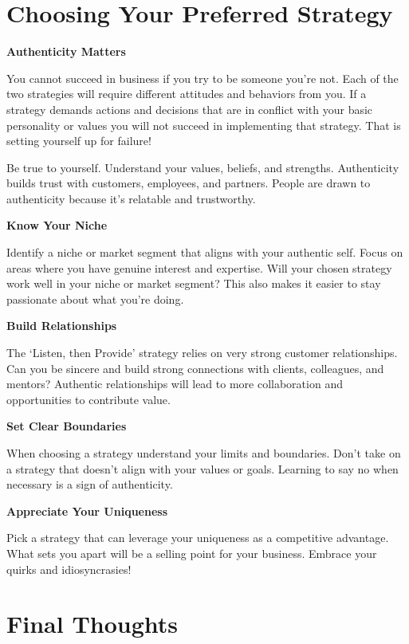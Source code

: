 \documentclass[
]{book}
\begin{document}
\hypertarget{choosing-your-preferred-strategy}{%
\section{Choosing Your Preferred Strategy}\label{choosing-your-preferred-strategy}}

\textbf{Authenticity Matters}

You cannot succeed in business if you try to be someone you're not. Each of the two strategies will require different attitudes and behaviors from you. If a strategy demands actions and decisions that are in conflict with your basic personality or values you will not succeed in implementing that strategy. That is setting yourself up for failure!

Be true to yourself. Understand your values, beliefs, and strengths. Authenticity builds trust with customers, employees, and partners. People are drawn to authenticity because it's relatable and trustworthy.

\textbf{Know Your Niche}

Identify a niche or market segment that aligns with your authentic self. Focus on areas where you have genuine interest and expertise. Will your chosen strategy work well in your niche or market segment? This also makes it easier to stay passionate about what you're doing.

\textbf{Build Relationships}

The {`Listen, then Provide'} strategy relies on very strong customer relationships. Can you be sincere and build strong connections with clients, colleagues, and mentors? Authentic relationships will lead to more collaboration and opportunities to contribute value.

\textbf{Set Clear Boundaries}

When choosing a strategy understand your limits and boundaries. Don't take on a strategy that doesn't align with your values or goals. Learning to say no when necessary is a sign of authenticity.

\textbf{Appreciate Your Uniqueness}

Pick a strategy that can leverage your uniqueness as a competitive advantage. What sets you apart will be a selling point for your business. Embrace your quirks and idiosyncrasies!

\hypertarget{final-thoughts}{%
\section{Final Thoughts}\label{final-thoughts}}
\end{document}
